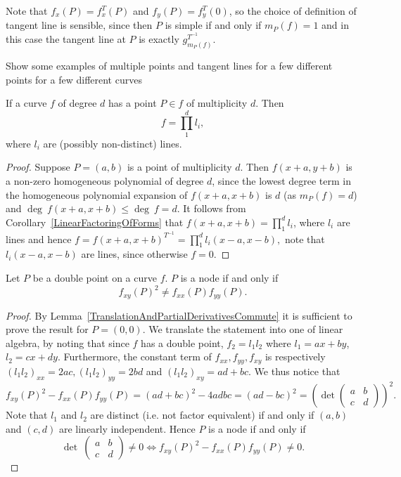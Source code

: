     \begin{remark}
        Note that $f_x(P)=f_x^T(P)$ and $f_y(P)=f_y^T(0)$, so the choice of definition of tangent line is sensible, since then $P$ is simple if and only if $m_P(f)=1$ and in this case the tangent line at $P$ is exactly $g_{m_P(f)}^{T^{-1}}$.
    \end{remark}
    \begin{example}
        {\Large Show some examples of multiple points and tangent lines for a few different points for a few different curves}
    \end{example}
    \begin{proposition}
        If a curve $f$ of degree $d$ has a point $P\in f$ of multiplicity $d$. Then 
        $$f = \prod_1^d l_i,$$
        where $l_i$ are (possibly non-distinct) lines. 
    \end{proposition}
    \begin{proof}
        Suppose $P=(a,b)$ is a point of multiplicity $d$. Then $f(x+a,y+b)$ is a non-zero homogeneous polynomial of degree $d$, since the lowest degree term in the homogeneous polynomial expansion of $f(x+a,x+b)$ is $d$ (as $m_P(f)=d$) and $\deg\ f(x+a,x+b)\leq \deg \ f = d$. It follows from Corollary~\ref{LinearFactoringOfForms} that $f(x+a,x+b)= \prod_1^d l_i$, where $l_i$ are lines and hence 
        $f=f(x+a,x+b)^{T^{-1}} = \prod_1^d l_i(x-a,x-b),$
        note that $l_i(x-a,x-b)$ are lines, since otherwise $f=0.$
    \end{proof}
    \begin{proposition}
        Let $P$ be a double point on a curve $f$. $P$ is a node if and only if $$f_{xy}(P)^2\neq f_{xx}(P)f_{yy}(P).$$
    \end{proposition}
    \begin{proof}
        By Lemma~\ref{TranslationAndPartialDerivativesCommute} it is sufficient to prove the result for $P=(0,0)$. We translate the statement into one of linear algebra, by noting that since $f$ has a double point, $f_2 = l_1l_2$ where $l_1=ax+by$, $l_2=cx+dy$. Furthermore, the constant term of $f_{xx},f_{yy},f_{xy}$ is respectively $(l_1l_2)_{xx}=2ac, (l_1l_2)_{yy}=2bd$ and $(l_1l_2)_{xy}=ad+bc$. We thus notice that 
        $$f_{xy}(P)^2-f_{xx}(P)f_{yy}(P) = (ad+bc)^2-4adbc=(ad-bc)^2=\left(\det \begin{pmatrix}
            a & b\\ c & d
        \end{pmatrix} \right)^2.$$
        Note that $l_1$ and $l_2$ are distinct (i.e. not factor equivalent) if and only if $(a,b)$ and $(c,d)$ are linearly independent. Hence $P$ is a node if and only if 
        $$\det \ \begin{pmatrix}
            a & b\\ c & d
        \end{pmatrix} \neq 0 \iff f_{xy}(P)^2-f_{xx}(P)f_{yy}(P)\neq 0.$$
    \end{proof}
